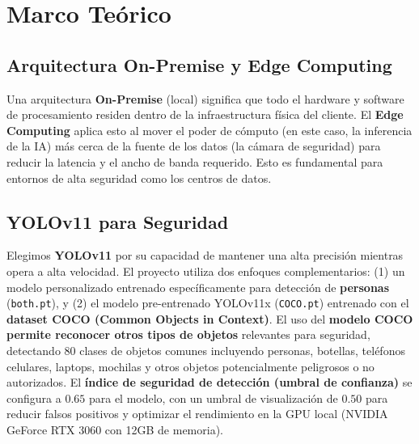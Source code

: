 \documentclass[12pt, a4paper]{article}
\begin{document}
\section{Marco Teórico}

\subsection{Arquitectura On-Premise y Edge Computing}
Una arquitectura \textbf{On-Premise} (local) significa que todo el hardware y software de procesamiento residen dentro de la infraestructura física del cliente. El \textbf{Edge Computing} aplica esto al mover el poder de cómputo (en este caso, la inferencia de la IA) más cerca de la fuente de los datos (la cámara de seguridad) para reducir la latencia y el ancho de banda requerido. Esto es fundamental para entornos de alta seguridad como los centros de datos.

\subsection{YOLOv11 para Seguridad}
Elegimos \textbf{YOLOv11} por su capacidad de mantener una alta precisión mientras opera a alta velocidad. El proyecto utiliza dos enfoques complementarios: (1) un modelo personalizado entrenado específicamente para detección de \textbf{personas} (\texttt{both.pt}), y (2) el modelo pre-entrenado YOLOv11x (\texttt{COCO.pt}) entrenado con el \textbf{dataset COCO (Common Objects in Context)}. El uso del \textbf{modelo COCO permite reconocer otros tipos de objetos} relevantes para seguridad, detectando 80 clases de objetos comunes incluyendo personas, botellas, teléfonos celulares, laptops, mochilas y otros objetos potencialmente peligrosos o no autorizados. El \textbf{índice de seguridad de detección (umbral de confianza)} se configura a $\mathbf{0.65}$ para el modelo, con un umbral de visualización de $\mathbf{0.50}$ para reducir falsos positivos y optimizar el rendimiento en la GPU local (NVIDIA GeForce RTX 3060 con 12GB de memoria).
\end{document}
